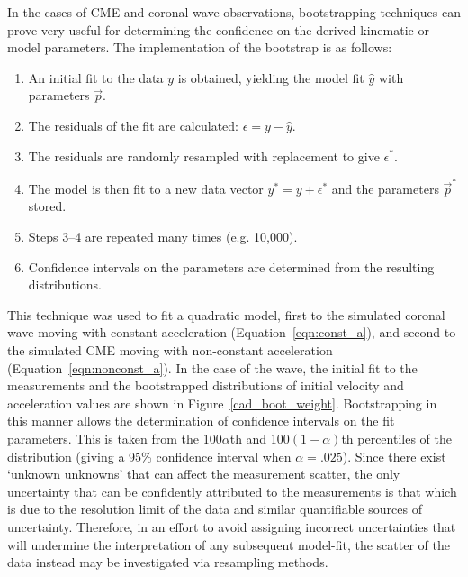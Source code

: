 \documentclass[structabstract]{aa}
\begin{document}
In the cases of CME and coronal wave observations, bootstrapping techniques can prove very useful for determining the confidence on the derived kinematic or model parameters. The implementation of the bootstrap is as follows:
\begin{enumerate}
\item An initial fit to the data $y$ is obtained, yielding the model fit $\hat{y}$ with parameters $\vec{p}$.
\item The residuals of the fit are calculated: $\epsilon = y - \hat{y}$.
\item The residuals are randomly resampled with replacement to give $\epsilon^*$.
\item The model is then fit to a new data vector $y^* = y + \epsilon^*$ and the parameters $\vec{p}^*$ stored.
\item Steps 3--4 are repeated many times (e.g. 10,000).
\item Confidence intervals on the parameters are determined from the resulting distributions.
\end{enumerate}
This technique was used to fit a quadratic model, first to the simulated coronal wave moving with constant acceleration (Equation~\ref{eqn:const_a}), and second to the simulated CME moving with non-constant acceleration (Equation~\ref{eqn:nonconst_a}). In the case of the wave, the initial fit to the measurements and the bootstrapped distributions of initial velocity and acceleration values are shown in Figure~\ref{cad_boot_weight}. Bootstrapping in this manner allows the determination of confidence intervals on the fit parameters. This is taken from the 100$\alpha$th and 100$\left(1-\alpha\right)$th percentiles of the distribution (giving a 95\% confidence interval when $\alpha=.025$). Since there exist `unknown unknowns' that can affect the measurement scatter, the only uncertainty that can be confidently attributed to the measurements is that which is due to the resolution limit of the data and similar quantifiable sources of uncertainty. Therefore, in an effort to avoid assigning incorrect uncertainties that will undermine the interpretation of any subsequent model-fit, the scatter of the data instead may be investigated via resampling methods.
\end{document}
